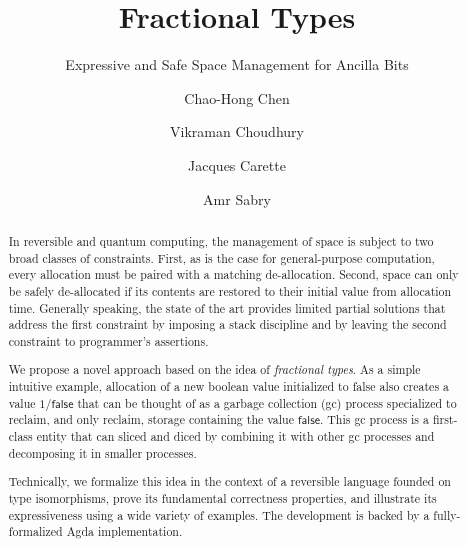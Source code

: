 \documentclass[sigplan,10pt,review,anonymous]{acmart}
\newcommand{\oneover}[1]{1/#1}
\begin{document}
\title{Fractional Types}
\subtitle{Expressive and Safe Space Management for Ancilla Bits}
\author{Chao-Hong Chen}

\author{Vikraman Choudhury}

\author{Jacques Carette}

\author{Amr Sabry}

\begin{abstract}
  In reversible and quantum computing, the management of space is
  subject to two broad classes of constraints. First, as is the case
  for general-purpose computation, every allocation must be paired
  with a matching de-allocation. Second, space can only be safely
  de-allocated if its contents are restored to their initial value
  from allocation time. Generally speaking, the state of the art
  provides limited partial solutions that address the first
  constraint by imposing a stack discipline and by leaving the second
  constraint to programmer's assertions.

  We propose a novel approach based on the idea of \emph{fractional
    types}. As a simple intuitive example, allocation of a new boolean
  value initialized to \textsf{false} also creates a value
  $\oneover{\textsf{false}}$ that can be thought of as a garbage
  collection (gc) process specialized to reclaim, and only reclaim,
  storage containing the value $\textsf{false}$. This gc process is a
  first-class entity that can sliced and diced by combining it with
  other gc processes and decomposing it in smaller
  processes.

  Technically, we formalize this idea in the context of a reversible
  language founded on type isomorphisms, prove its fundamental
  correctness properties, and illustrate its expressiveness using a
  wide variety of examples. The development is backed by a
  fully-formalized Agda implementation.
\end{abstract}

\maketitle





\end{document}
